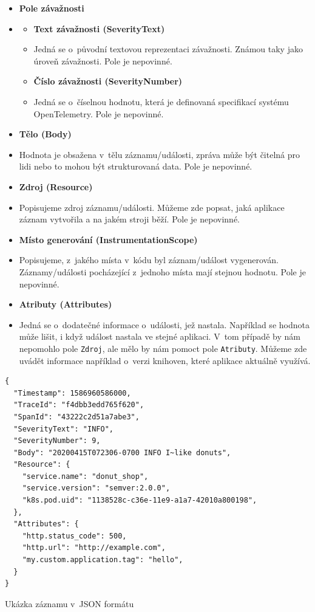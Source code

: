 \begin{itemize}
\begin{itemize}
        \end{itemize}
        \item{\textbf{Pole závažnosti}}
        \item[]
        \begin{itemize}
            \item{\textbf{Text závažnosti (SeverityText)}}
        \item[]
            Jedná se o~původní textovou reprezentaci závažnosti. Známou taky jako úroveň závažnosti. Pole je nepovinné.
        \item{\textbf{Číslo závažnosti (SeverityNumber)}}
        \item[]
            Jedná se o~číselnou hodnotu, která je definovaná specifikací systému OpenTelemetry. Pole je nepovinné.
        \end{itemize}
        \item{\textbf{Tělo (Body)}}
        \item[]
            Hodnota je obsažena v~tělu záznamu/události, zpráva může být čitelná pro lidi nebo to mohou být strukturovaná data. Pole je nepovinné.
        \item{\textbf{Zdroj (Resource)}}
        \item[]
            Popisujeme zdroj záznamu/události. Můžeme zde popsat, jaká aplikace záznam vytvořila a na jakém stroji běží. Pole je nepovinné.
        \item{\textbf{Místo generování (InstrumentationScope)}}
        \item[]
            Popisujeme, z~jakého místa v~kódu byl záznam/událost vygenerován. Záznamy/události pocházející z~jednoho místa mají stejnou hodnotu. Pole je nepovinné.
        \item{\textbf{Atributy (Attributes)}}
        \item[]
        Jedná se o~dodatečné informace o~události, jež nastala. Například se hodnota může lišit, i když událost nastala ve stejné aplikaci. V~tom případě by nám nepomohlo pole \texttt{Zdroj}, ale mělo by nám pomoct pole \texttt{Atributy}. Můžeme zde uvádět informace například o~verzi knihoven, které aplikace aktuálně využívá.
    \end{itemize}

\begin{listing}[H]
    \begin{verbatim}
{
  "Timestamp": 1586960586000,
  "TraceId": "f4dbb3edd765f620",
  "SpanId": "43222c2d51a7abe3",
  "SeverityText": "INFO",
  "SeverityNumber": 9,
  "Body": "20200415T072306-0700 INFO I~like donuts",
  "Resource": {
    "service.name": "donut_shop",
    "service.version": "semver:2.0.0",
    "k8s.pod.uid": "1138528c-c36e-11e9-a1a7-42010a800198",
  },
  "Attributes": {
    "http.status_code": 500,
    "http.url": "http://example.com",
    "my.custom.application.tag": "hello",
  }
}
\end{verbatim}
    \caption{Ukázka záznamu v~JSON formátu}
    \label{lst:exampleLog}
\end{listing}

